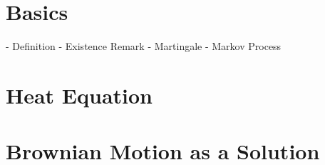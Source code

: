 \section{Basics}
\label{brown:basics}
- Definition
- Existence Remark
- Martingale
- Markov Process

\section{Heat Equation}

\section{Brownian Motion as a Solution}